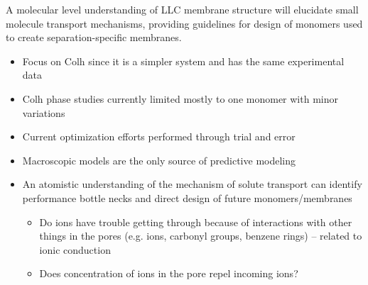 \documentclass{article}
\begin{document}
	
	A molecular level understanding of LLC membrane structure will elucidate small molecule transport mechanisms, providing guidelines for design of monomers used to create separation-specific membranes.
	\begin{itemize}
		\item Focus on Colh since it is a simpler system and has the same experimental data
		\item Colh phase studies currently limited mostly to one monomer with minor variations
		\item Current optimization efforts performed through trial and error
		\item Macroscopic models are the only source of predictive modeling
		\item An atomistic understanding of the mechanism of solute transport can identify
		performance bottle necks and direct design of future monomers/membranes
		\begin{itemize}
			\item Do ions have trouble getting through because of interactions with other things in the pores (e.g. ions, carbonyl groups, benzene rings) -- related to ionic conduction
			\item Does concentration of ions in the pore repel incoming ions?
		\end{itemize}
	\end{itemize}
	 
\end{document}
